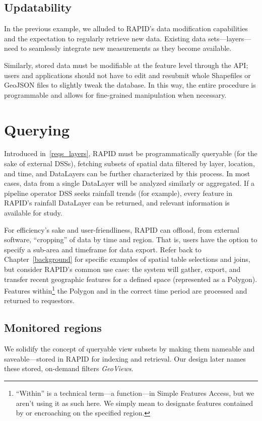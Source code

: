 \subsection{Updatability}
In the previous example, we alluded to RAPID's data modification capabilities and the expectation to regularly retrieve new data. Existing data sets---layers---need to seamlessly integrate new measurements as they become available.

Similarly, stored data must be modifiable at the feature level through the API; users and applications should not have to edit and resubmit whole Shapefiles or GeoJSON files to slightly tweak the database. In this way, the entire procedure is programmable and allows for fine-grained manipulation when necessary.

\section{Querying}

Introduced in~\ref{reqs_layers}, RAPID must be programmatically queryable (for the sake of external DSSs), fetching subsets of spatial data filtered by layer, location, and time, and DataLayers can be further characterized by this process. In most cases, data from a single DataLayer will be analyzed similarly or aggregated. If a pipeline operator DSS seeks rainfall trends (for example), every feature in RAPID's rainfall DataLayer can be returned, and relevant information is available for study.

For efficiency's sake and user-friendliness, RAPID can offload, from external software, ``cropping'' of data by time and region. That is, users have the option to specify a sub-area and timeframe for data export. Refer back to Chapter~\ref{background} for specific examples of spatial table selections and joins, but consider RAPID's common use case: the system will gather, export, and transfer recent geographic features for a defined space (represented as a Polygon). Features within\footnote{``Within'' is a technical term---a function---in Simple Features Access, but we aren't using it as such here. We simply mean to designate features contained by or encroaching on the specified region.} the Polygon and in the correct time period are processed and returned to requestors.

\subsection{Monitored regions}
We solidify the concept of queryable view subsets by making them nameable and saveable---stored in RAPID for indexing and retrieval. Our design later names these stored, on-demand filters \textit{GeoViews}.

